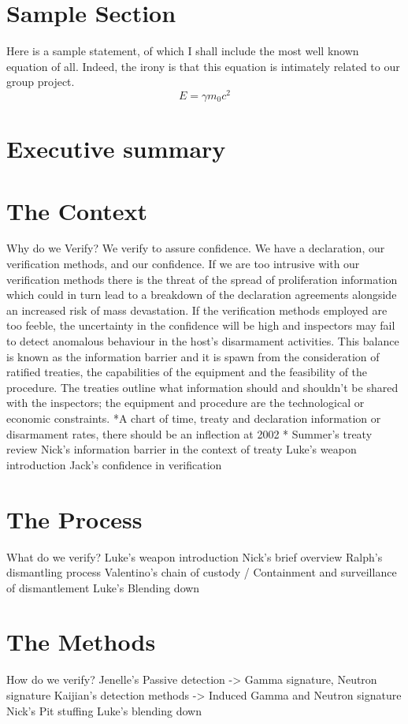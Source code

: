 \documentclass[a4paper]{report}
\begin{document}
\tableofcontents

\section{Sample Section}
Here is a sample statement, of which I shall 
include the most well known equation of all. 
Indeed, the irony is that this equation is 
intimately related to our group project. 
\[ 
E = \gamma m_0 c^2
\]

\section{Executive summary}
\section{The Context}
  Why do we Verify?
We verify to assure confidence. We have a declaration, our verification methods, and our confidence. If we are too intrusive with our verification methods there is the threat of the spread of proliferation information which could in turn lead to a breakdown of the declaration agreements alongside an increased risk of mass devastation. If the verification methods employed are too feeble, the uncertainty in the confidence will be high and inspectors may fail to detect anomalous behaviour in the host’s disarmament activities.
This balance is known as the information barrier and it is spawn from the consideration of ratified treaties, the capabilities of the equipment and the feasibility of the procedure. The treaties outline what information should and shouldn’t be shared with the inspectors; the equipment and procedure are the technological or economic constraints.
*A chart of time, treaty and declaration information or disarmament rates, there should be an inflection at 2002 *
Summer’s treaty review
Nick’s information barrier in the context of treaty
Luke’s weapon introduction
Jack’s confidence in verification
\section{The Process}
	What do we verify?
Luke’s weapon introduction
Nick’s brief overview 
Ralph’s dismantling process
Valentino’s chain of custody / Containment and surveillance of dismantlement 
Luke’s Blending down
\section{The Methods}
	How do we verify?
Jenelle’s Passive detection -> Gamma signature, Neutron signature
Kaijian’s detection methods -> Induced Gamma and Neutron signature 
Nick’s Pit stuffing
Luke’s blending down
\end{document}
